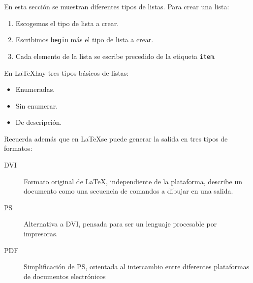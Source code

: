 En esta sección se muestran diferentes tipos de listas. Para crear una lista:

\begin{enumerate}
	\item Escogemos el tipo de lista a crear.
	\item Escribimos \texttt{begin} más el tipo de lista a crear. 
	\item Cada elemento de la lista se escribe precedido de la etiqueta \texttt{item}.
\end{enumerate}

En \LaTeX hay tres tipos básicos de listas: 

\begin{itemize}
	\item Enumeradas.
	\item Sin enumerar. 
	\item De descripción.
\end{itemize}

Recuerda además que en \LaTeX se puede generar la salida en tres tipos de formatos:

\begin{description}
	\item[DVI] Formato original de \LaTeX, independiente de la plataforma, describe un documento como una secuencia de comandos a dibujar en una salida.
	\item[PS] Alternativa a DVI, pensada para ser un lenguaje procesable por impresoras.   
	\item[PDF] Simplificación de PS, orientada al intercambio entre diferentes plataformas	de documentos electrónicos 
\end{description}
